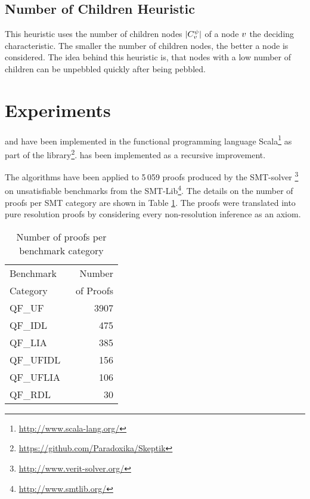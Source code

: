 \documentclass{llncs}
\begin{document}
\subsection{Number of Children Heuristic}

This heuristic uses the number of children nodes $|C_{v}^{\psi}|$ of a node $v$ the deciding characteristic. 
The smaller the number of children nodes, the better a node is considered. 
The idea behind this heuristic is, that nodes with a low number of children can be unpebbled quickly after being pebbled.

\section{Experiments} \label{sec:exp}

{\LowerUnivalents} and {\LUnivRPI} have been implemented in the functional programming
language Scala\footnote{\url{http://www.scala-lang.org/}} as part of the \skeptik
library\footnote{\url{https://github.com/Paradoxika/Skeptik}}. {\LowerUnivalents} has been implemented as a
recursive  improvement.

The algorithms have been applied to 5\,059 proofs produced by the SMT-solver
{\veriT}\footnote{\url{http://www.verit-solver.org/}} on unsatisfiable benchmarks from the
SMT-Lib\footnote{\url{http://www.smtlib.org/}}.  The details on the number of proofs per SMT category
are shown in Table \ref{tab:benchmarks}.  The proofs were translated into pure resolution proofs by
considering every non-resolution inference as an axiom.

\begin{table}[tb]
  \caption{Number of proofs per benchmark category}
  \label{tab:benchmarks}
  \centering
  \begin{tabular}{lr}
    \toprule
    Benchmark~ &  Number \\
    Category       & ~of Proofs \\
    \midrule
    QF\_UF      & 3907 \\
    QF\_IDL     &  475 \\
    QF\_LIA     &  385 \\
    QF\_UFIDL   &  156 \\
    QF\_UFLIA   &  106 \\
    QF\_RDL     &   30 \\
    \bottomrule
  \end{tabular}
\end{table}
\end{document}
